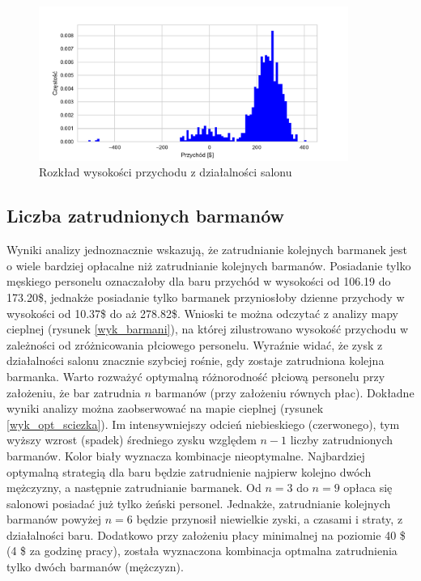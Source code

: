 \documentclass[12pt, a4paper, oneside]{mwart} %
\begin{document}
\begin{figure}
\centering
\caption{Rozkład wysokości przychodu z działalności salonu}
\label{wyk_przychod}
\includegraphics[width = 0.9\textwidth]{wykresy/histogram.pdf}
\end{figure}

\subsection{Liczba zatrudnionych barmanów}
Wyniki analizy jednoznacznie wskazują, że zatrudnianie kolejnych barmanek jest o wiele bardziej opłacalne niż zatrudnianie kolejnych barmanów. Posiadanie tylko męskiego personelu oznaczałoby dla baru przychód w wysokości od 106.19 do 173.20\$, jednakże posiadanie tylko barmanek przyniosłoby dzienne przychody w wysokości od 10.37\$ do aż 278.82\$. Wnioski te można odczytać z analizy mapy cieplnej (rysunek \ref{wyk_barmani}), na której zilustrowano wysokość przychodu w zależności od zróżnicowania płciowego personelu. Wyraźnie widać, że zysk z działalności salonu znacznie szybciej rośnie, gdy zostaje zatrudniona kolejna barmanka. Warto rozważyć optymalną różnorodność płciową personelu przy założeniu, że bar zatrudnia $n$ barmanów (przy założeniu równych płac). Dokładne wyniki analizy można zaobserwować na mapie cieplnej (rysunek \ref{wyk_opt_sciezka}). Im intensywniejszy odcień niebieskiego (czerwonego), tym wyższy wzrost (spadek) średniego zysku względem $n-1$ liczby zatrudnionych barmanów. Kolor biały wyznacza kombinacje nieoptymalne. Najbardziej optymalną strategią dla baru będzie zatrudnienie najpierw kolejno dwóch mężczyzny, a następnie zatrudnianie barmanek. Od $n =3$ do $n=9$ opłaca się salonowi posiadać już tylko żeński personel. Jednakże, zatrudnianie kolejnych barmanów powyżej $n=6$ będzie przynosił niewielkie zyski, a czasami i straty, z działalności baru. Dodatkowo przy założeniu płacy minimalnej na poziomie 40 \$ (4 \$ za godzinę pracy), została wyznaczona kombinacja optmalna zatrudnienia tylko dwóch barmanów (mężczyzn).
\end{document}
